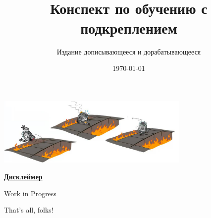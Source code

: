 \documentclass[a4paper, 10pt, oneside]{memoir}
\title{
\vspace{4cm}
\normalfont \normalsize 
\horrule{0.5pt} \\[0.4cm]
\huge Конспект по обучению с подкреплением
\horrule{2pt} \\[0.5cm]
}
\author{Издание дописывающееся и дорабатывающееся}
\date{\normalsize\today}
\begin{document}

\maketitle
\thispagestyle{empty}

\begin{center}
    \includegraphics[width=0.7\textwidth]{Images/robot.png}
\end{center}

\vspace{2cm}
\begin{center}
\textcolor{ChadBlue}{\underline{\textbf{Дисклеймер}}}

\vspace{1cm}
Work in Progress
\end{center}


\newpage
\tableofcontents*










\vspace{2cm}
\begin{center}
That's all, folks!
\end{center}

\newpage
\end{document}
